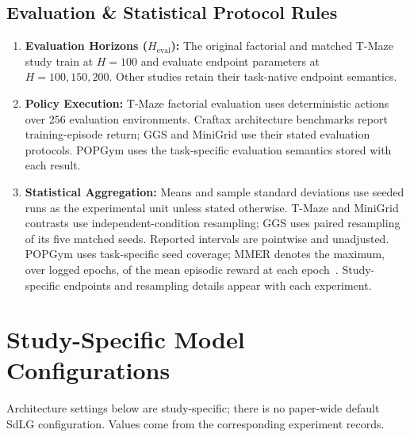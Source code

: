 \subsection{Evaluation \& Statistical Protocol Rules}
\begin{enumerate}
    \item \textbf{Evaluation Horizons ($H_{\text{eval}}$):} The original factorial and matched T-Maze study train at $H=100$ and evaluate endpoint parameters at $H=100,150,200$. Other studies retain their task-native endpoint semantics.
    \item \textbf{Policy Execution:} T-Maze factorial evaluation uses deterministic actions over 256 evaluation environments. Craftax architecture benchmarks report training-episode return; GGS and MiniGrid use their stated evaluation protocols. POPGym uses the task-specific evaluation semantics stored with each result.
    \item \textbf{Statistical Aggregation:} Means and sample standard deviations use seeded runs as the experimental unit unless stated otherwise. T-Maze and MiniGrid contrasts use independent-condition resampling; GGS uses paired resampling of its five matched seeds. Reported intervals are pointwise and unadjusted. POPGym uses task-specific seed coverage; MMER denotes the maximum, over logged epochs, of the mean episodic reward at each epoch~\citep{morad2023popgym}. Study-specific endpoints and resampling details appear with each experiment.
\end{enumerate}

\section{Study-Specific Model Configurations}
\label{app:model_configs}

Architecture settings below are study-specific; there is no paper-wide default SdLG configuration. Values come from the corresponding experiment records.

